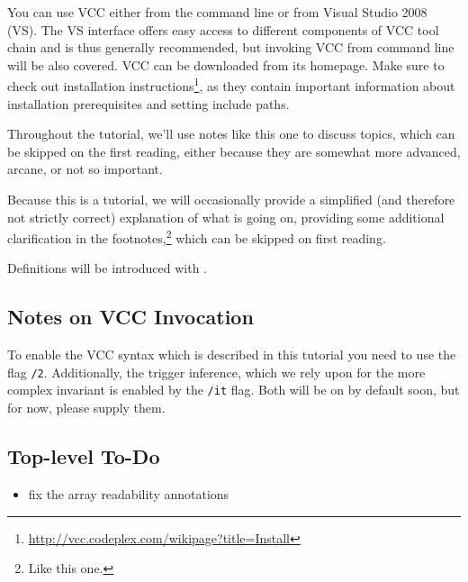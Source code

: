 
You can use VCC either from the command line or from Visual Studio
2008 (VS).
The VS interface offers easy access to different components of
VCC tool chain and is thus generally recommended,
but invoking VCC from command line will be also covered.
VCC can be downloaded from its homepage.
Make sure to check out installation instructions\footnote{\url{http://vcc.codeplex.com/wikipage?title=Install}},
as they contain important information about installation prerequisites 
and setting include paths.


\begin{note}
  Throughout the tutorial, we'll use notes like this one to discuss
  topics, which can be skipped on the first reading, either because
  they are somewhat more advanced, arcane, or not so important.
\end{note}

  Because this is a tutorial, we will occasionally provide a simplified (and
  therefore not strictly correct) explanation of what is going on, providing
  some additional clarification in the footnotes,\footnote{Like this one.}
  which can be skipped on first reading.

  Definitions will be introduced with .

\subsection{Notes on VCC Invocation}

To enable the VCC syntax which is described in this tutorial you need
to use the flag \texttt{/2}.
Additionally, the trigger inference, which we rely upon for
the more complex invariant is enabled by the \texttt{/it}
flag.
Both will be on by default soon, but for now, please supply them.

\subsection{Top-level To-Do}

\begin{itemize}
\item fix the  array readability annotations
\end{itemize}

